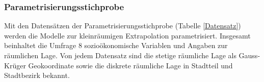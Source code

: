 \documentclass{Vorlage}
\begin{document}
\subsubsection{Parametrisierungsstichprobe}
Mit den Datensätzen der Parametrisierungsstichprobe (Tabelle \ref{Datensatz}) werden die Modelle zur kleinräumigen  Extrapolation parametrisiert. Insgesamt beinhaltet die Umfrage 8 sozioökonomische Variablen und Angaben zur räumlichen Lage. Von jedem Datensatz sind die stetige räumliche Lage als Gauss-Krüger Geokoordinate sowie die diskrete räumliche Lage in Stadtteil und Stadtbezirk bekannt.\\


\begin{table}[h]
\centering
\caption{Erhobene sozioökonomische und geographische Variablen der Parameterisierungsstichprobe und deren Anzahl der Ausprägungen sowie vermutete Modellierung im additiven Modell.}
\label{Datensatz}
\end{table}
\end{document}
